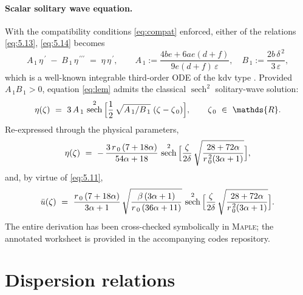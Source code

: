 \documentclass[alpha-refs, 12pt]{wiley-article}
\DeclareMathOperator{\sech}{sech}
\newcommand{\R}{\mathds{R}}
\newcommand{\eps}{\varepsilon}
\begin{document}
\paragraph{Scalar solitary wave equation.} With the compatibility conditions \eqref{eq:compat} enforced, either of the relations \eqref{eq:5.13}, \eqref{eq:5.14} becomes
\begin{equation}
  A_{\,1}\,\eta^{\,\prime}
  \;-\;
  B_{\,1}\,\eta^{\,\prime\prime\prime}
  \;=\;
  \eta\,\eta^{\,\prime},
  \qquad
  A_{\,1}:=\frac{4be+6ae(d+f)}{9e(d+f)\,\eps},
  \quad
  B_{\,1}:=\frac{2b\,\delta^{\,2}}{3\,\eps},
  \label{eq:lem}
\end{equation}
which is a well-known integrable third-order ODE of the \acrshort{kdv} type \citep{Newell1977}. Provided $A_{\,1}B_{\,1}>0$, equation \eqref{eq:lem} admits the classical $\sech^{2}$ solitary-wave solution:
\begin{equation*}
  \eta(\zeta)\ =\ 3\,A_{\,1}\,
  \sech^{2}\,\Bigl[
    \frac12\,\sqrt{A_{\,1}/B_{\,1}}\;(\zeta-\zeta_{\,0})
  \Bigr], \qquad \zeta_{\,0}\ \in\ \R.
\end{equation*}
Re-expressed through the physical parameters,
\begin{equation}
  \eta(\zeta)\ =\ -\,\frac{3\,r_{\,0}\,(7+18\alpha)}{54\alpha+18}\,
  \sech^{2}\,\Bigl[\frac{\zeta}{2\delta}\,\sqrt{\frac{28+72\alpha}{r_{\,0}^{\,2}(3\alpha+1)}}\Bigr], \label{eq:solitarybouss1}
\end{equation}
and, by virtue of \eqref{eq:5.11},
\begin{equation}
  \bar{u}(\zeta)\ =\ \frac{r_{\,0}\,(7+18\alpha)}{3\alpha+1}\,
  \sqrt{\frac{\beta\,(3\alpha+1)}{r_{\,0}\,(36\alpha+11)}}\,
  \sech^{2}\,\Bigl[\frac{\zeta}{2\delta}\,\sqrt{\frac{28+72\alpha}{r_{\,0}^{\,2}(3\alpha+1)}}\Bigr]. \label{eq:solitarybouss2}
\end{equation}
The entire derivation has been cross-checked symbolically in \textsc{Maple}; the annotated worksheet is provided in the accompanying codes repository.

\section{Dispersion relations}\label{sec:dispersion}
\end{document}
